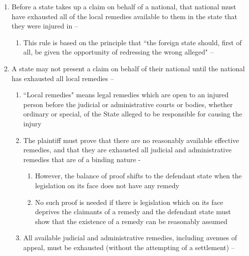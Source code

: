 \begin{enumerate}
    \begin{enumerate}
        \item Before a state takes up a claim on behalf of a national, that national must have exhausted all of the local remedies available to them in the state that they were injured in -- 
        \begin{enumerate}
            \item This rule is based on the principle that ``the foreign state should, first of all, be given the opportunity of redressing the wrong alleged" -- 
        \end{enumerate}
        \item A state may not present a claim on behalf of their national until the national has exhausted all local remedies -- 
        \begin{enumerate}
            \item ``Local remedies" means legal remedies which are open to an injured person before the judicial or administrative courts or bodies, whether ordinary or special, of the State alleged to be responsible for causing the injury 
            \item The plaintiff must prove that there are no reasonably available effective remedies, and that they are exhausted all judicial and administrative remedies that are of a binding nature - 
            \begin{enumerate}
                \item However, the balance of proof shifts to the defendant state when the legislation on its face does not have any remedy
                \item No such proof is needed if there is legislation which on its face deprives the claimants of a remedy and the defendant state must show that the existence of a remedy can be reasonably assumed
            \end{enumerate}
            \item All available judicial and administrative remedies, including avenues of appeal, must be exhausted (without the attempting of a settlement) -- 

\end{enumerate}
\end{enumerate}
\end{enumerate}
